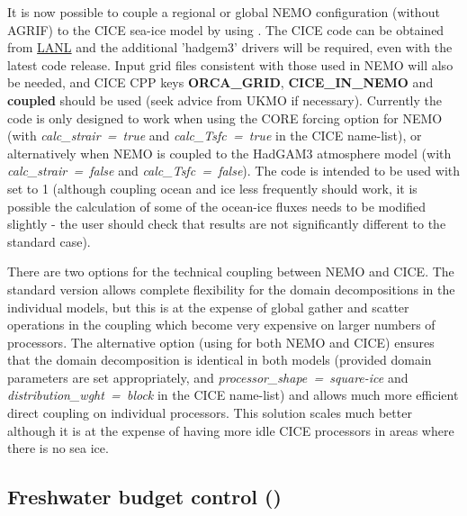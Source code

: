 It is now possible to couple a regional or global NEMO configuration (without AGRIF) to the CICE sea-ice
model by using .  The CICE code can be obtained from 
\href{http://oceans11.lanl.gov/trac/CICE/}{LANL} and the additional 'hadgem3' drivers will be required, 
even with the latest code release.  Input grid files consistent with those used in NEMO will also be needed, 
and CICE CPP keys \textbf{ORCA\_GRID}, \textbf{CICE\_IN\_NEMO} and \textbf{coupled} should be used (seek advice from UKMO 
if necessary).  Currently the code is only designed to work when using the CORE forcing option for NEMO (with
\textit{calc\_strair~=~true} and \textit{calc\_Tsfc~=~true} in the CICE name-list), or alternatively when NEMO 
is coupled to the HadGAM3 atmosphere model (with \textit{calc\_strair~=~false} and \textit{calc\_Tsfc~=~false}).
The code is intended to be used with  set to 1 (although coupling ocean and ice less frequently 
should work, it is possible the calculation of some of the ocean-ice fluxes needs to be modified slightly - the
user should check that results are not significantly different to the standard case).

There are two options for the technical coupling between NEMO and CICE.  The standard version allows
complete flexibility for the domain decompositions in the individual models, but this is at the expense of global
gather and scatter operations in the coupling which become very expensive on larger numbers of processors. The
alternative option (using  for both NEMO and CICE) ensures that the domain decomposition is
identical in both models (provided domain parameters are set appropriately, and 
\textit{processor\_shape~=~square-ice} and \textit{distribution\_wght~=~block} in the CICE name-list) and allows
much more efficient direct coupling on individual processors.  This solution scales much better although it is at 
the expense of having more idle CICE processors in areas where there is no sea ice.

\subsection   [Freshwater budget control (\textit{sbcfwb})]
			{Freshwater budget control ()}
\label{SBC_fwb}

